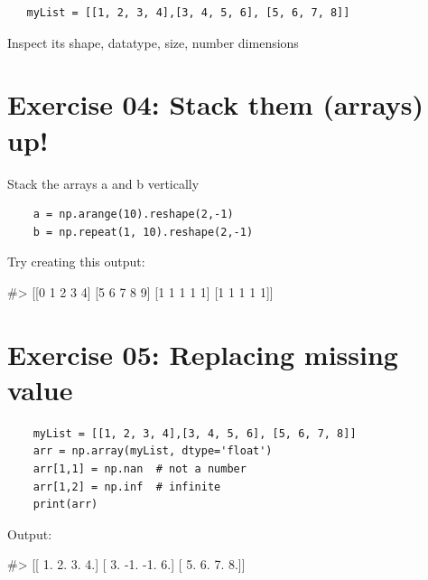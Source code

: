 \documentclass{42-en}
\begin{document}
\begin{lstlisting}
   myList = [[1, 2, 3, 4],[3, 4, 5, 6], [5, 6, 7, 8]]
\end{lstlisting}

\vspace{1em}
Inspect its shape, datatype, size, number dimensions 
\nextexercice
\newpage



\chapter{Exercise 04:  Stack them (arrays) up!}
\makeheaderfiles
\vspace{1em}
Stack the arrays a and b vertically
\vspace{1em}

\begin{lstlisting}
    a = np.arange(10).reshape(2,-1)
    b = np.repeat(1, 10).reshape(2,-1)
\end{lstlisting}

\vspace{1em}
Try creating this output:\linebreak
\begin{42console}
#> [[0 1 2 3 4]
    [5 6 7 8 9]
    [1 1 1 1 1]
    [1 1 1 1 1]]
\end{42console}
\nextexercice
\newpage



\chapter{Exercise 05:  Replacing missing value}
\makeheaderfiles
\vspace{1em}

\begin{lstlisting}
    myList = [[1, 2, 3, 4],[3, 4, 5, 6], [5, 6, 7, 8]]
    arr = np.array(myList, dtype='float')
    arr[1,1] = np.nan  # not a number
    arr[1,2] = np.inf  # infinite
    print(arr)
\end{lstlisting}

\vspace{1em}
Output:\linebreak
\begin{42console}
#> [[ 1.  2.  3.  4.]
    [ 3. -1. -1.  6.]
    [ 5.  6.  7.  8.]]
\end{42console}
\nextexercice
\newpage
\end{document}
